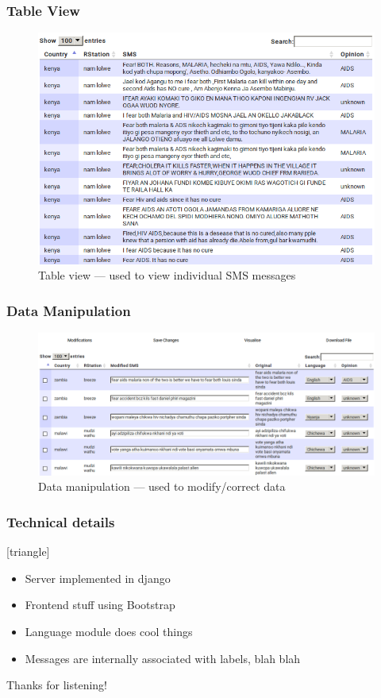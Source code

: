 \documentclass{beamer}
\begin{document}
\begin{frame}
\frametitle{Table View}
  \begin{figure}
    \centering
    \includegraphics[scale=0.3]{./table.png}
    \caption{Table view --- used to view individual SMS messages}
  \end{figure}
\end{frame}

\begin{frame}
\frametitle{Data Manipulation}
  \begin{figure}
    \centering
    \includegraphics[scale=0.3]{./manip.png}
    \caption{Data manipulation --- used to modify/correct data}
  \end{figure}
\end{frame}


\begin{frame}
\frametitle{Technical details}
[triangle]
\begin{itemize}[<+->]
\item Server implemented in django
\item Frontend stuff using Bootstrap
\item Language module does cool things
\item Messages are internally associated with labels, blah blah
\end{itemize}
\end{frame}

\begin{frame}[c]
\begin{center}
\Huge Thanks for listening!
\end{center}
\end{frame}
\end{document}
